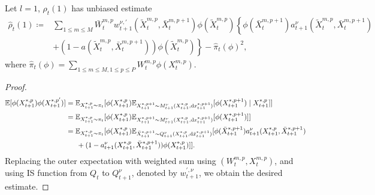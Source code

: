 \begin{proposition}
    Let $l=1$, $\rho_{t}(1)$ has unbiased estimate
    \begin{equation}
        \begin{split}
            \hat{\rho}_{t}(1)\coloneq &\sum_{1\leq m\leq M} \bar{W}_t^{m,p} w_{t+1}^{\nu, '}(\tilde{X}_t^{m,p},\bar{X}_t^{m,p+1})  \phi(\tilde{X}_{t}^{m,p}) \left\{\phi(\bar{X}_{t}^{m,p+1}) a_{t+1}^{\nu}(\tilde{X}_t^{m,p},\bar{X}_t^{m,p+1})\right. \\
            &\left.+ (1-a(\tilde{X}_t^{m,p},\bar{X}_t^{m,p+1}))  \phi(\tilde{X}_{t}^{m,p}) \right\} - \hat{\pi}_t(\phi)^2,
        \end{split}
    \end{equation}
    where $\hat{\pi}_t(\phi) = \sum_{1\leq m\leq M, 1\leq p\leq P}W_{t}^{m,p}\phi(X_t^{m,p})$.
    \begin{proof}
        \begin{equation}
            \begin{split}
                \bbE[\phi(X_{t+1}^{*,p}) \phi(X_{t+1}^{*,p'})] &= \bbE_{X_{t+1}^{*,p}\sim \pi_t}[\phi(X_{t+1}^{*,p})\bbE_{X_{t+1}^{*,p+1}\sim M_{t+1}^{\nu}(X_{t+1}^{*,p}, \dd x_{t+1}^{*,p+1})}[\phi(X_{t+1}^{*,p+1})\mid X_{t+1}^{*,p}]]\\
                &=\bbE_{X_{t+1}^{*,p}\sim \pi_t}[\phi(X_{t+1}^{*,p})\bbE_{X_{t+1}^{*,p+1}\sim M_{t+1}^{\nu}(X_{t+1}^{*,p}, \dd x_{t+1}^{*,p+1})}[\phi(X_{t+1}^{*,p+1})]]\\
                &=\bbE_{X_{t+1}^{*,p}\sim \pi_t}[\phi(X_{t+1}^{*,p})\bbE_{\bar{X}_{t+1}^{*,p+1}\sim Q_{t+1}^{\nu}(X_{t+1}^{*,p}, \dd \bar{x}_{t+1}^{*,p+1})}[ \phi(\bar{X}_{t+1}^{*,p+1}) a_{t+1}^{\nu}(X_{t+1}^{*,p}, \bar{X}_{t+1}^{*,p+1}) \\
                &\indent + (1 -a_{t+1}^{\nu}(X_{t+1}^{*,p}, \bar{X}_{t+1}^{*,p+1}))\phi(X_{t+1}^{*,p}) ]].
            \end{split}
        \end{equation}
        Replacing the outer expectation with weighted sum using $(W_{t}^{m,p}, X_{t}^{m,p})$, and using IS function from $Q_{t}$ to $Q_{t+1}^{\nu}$, denoted by $w_{t+1}^{',\nu}$, we obtain the desired estimate.
    \end{proof}
\end{proposition}
